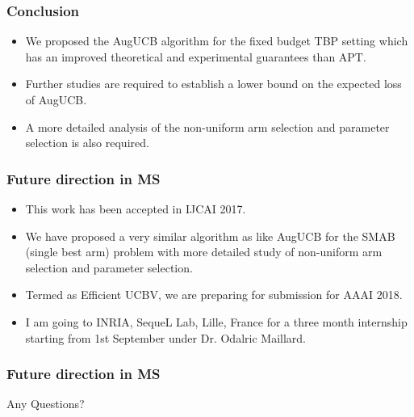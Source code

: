 \begin{frame}
\frametitle{Conclusion}
\begin{itemize}
\item<1-> We proposed the AugUCB algorithm for the fixed budget TBP setting which has an improved theoretical and experimental guarantees than APT.
\item<2-> Further studies are required to establish a lower bound on the expected loss of AugUCB.
\item<3-> A more detailed analysis of the non-uniform arm selection and parameter selection is also required.
\end{itemize}
\end{frame}

\begin{frame}
\frametitle{Future direction in MS}
\begin{itemize}
\item<1-> This work has been accepted in IJCAI 2017.
\item<2-> We have proposed a very similar algorithm as like AugUCB for the SMAB (single best arm) problem with more detailed study of non-uniform arm selection and parameter selection.
\item<3-> Termed as Efficient UCBV, we are preparing for submission for AAAI 2018.
\item<4-> I am going to INRIA, SequeL Lab, Lille, France for a three month internship starting from 1st September under Dr. Odalric Maillard.
\end{itemize}
\end{frame}

\begin{frame}
\frametitle{Future direction in MS}
\Huge{\centerline{Any Questions? }}

\end{frame}